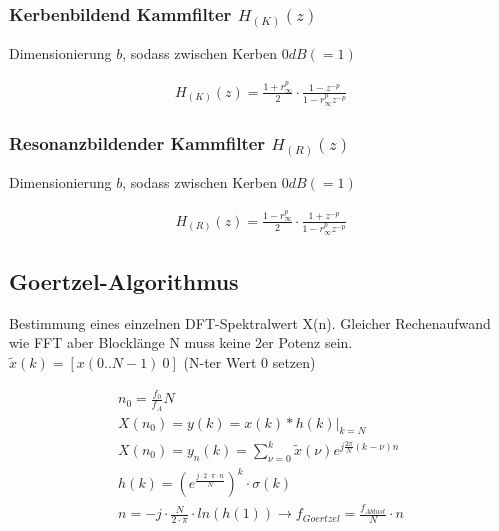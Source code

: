 \documentclass[10pt,a4paper]{article}
\begin{document}
\subsubsection{Kerbenbildend Kammfilter $H_{(K)}(z)$}
Dimensionierung $b$, sodass zwischen Kerben $0dB(=1)$
  \begin{mdframed}[style=exercise]
    \begin{align}
        H_{(K)}(z)=\frac{1+r_\infty ^p}{2}\cdot \frac{1-z^{-p}}{1-r_\infty^p z^{-p}}
    \end{align}
  \end{mdframed}
\subsubsection{Resonanzbildender Kammfilter $H_{(R)}(z)$}
Dimensionierung $b$, sodass zwischen Kerben $0dB(=1)$
  \begin{mdframed}[style=exercise]
    \begin{align}
        H_{(R)}(z)= \frac{1-r_\infty ^p}{2}\cdot \frac{1+z^{-p}}{1-r_\infty^p z^{-p}}
    \end{align}
  \end{mdframed}
\subsection{Goertzel-Algorithmus}
Bestimmung eines einzelnen DFT-Spektralwert X(n). Gleicher Rechenaufwand wie FFT aber Blocklänge N muss keine 2er Potenz sein. $\tilde{x}(k)=[x(0..N-1) \ 0]$ (N-ter Wert 0 setzen)
  \begin{mdframed}[style=exercise]
    \begin{align}
        n_0 = \frac{f_0}{f_A}N\\
        X(n_0)= y(k)=x(k)*h(k)|_{k=N}\\
        X(n_0)=y_n(k)=\sum_{\nu=0}^{k}\tilde{x}(\nu)e^{j\frac{2\pi}{N}(k-\nu)n}\\
        h(k)=(e^{\frac{j\cdot 2\cdot\pi\cdot n}{N}})^{k}\cdot\sigma(k)\\
        n = -j\cdot\frac{N}{2\cdot\pi}\cdot ln(h(1)) \rightarrow f_{Goertzel}=\frac{f_{Abtast}}{N}\cdot n
    \end{align}
  \end{mdframed}
\end{document}
